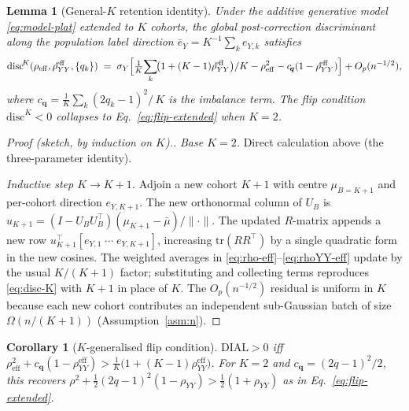 \documentclass[11pt,a4paper]{article}
\newtheorem{corollary}[theorem]{Corollary}
\newtheorem{lemma}[theorem]{Lemma}
\begin{document}
\begin{lemma}[General-$K$ retention identity]
\label{lem:retention-K}
Under the additive generative model
\eqref{eq:model-plat} extended to $K$ cohorts, the
global post-correction discriminant along the population label
direction $\bar e_Y=K^{-1}\sum_k e_{Y,k}$ satisfies
\begin{equation}
  \mathrm{disc}^{\!K}(\rho_{\mathrm{eff}},\rho_{YY}^{\!\mathrm{eff}},\{q_k\})
  \;=\; \sigma_Y\Bigl[
     \tfrac{1}{K}\!\sum_{k}\!\bigl(1+(K-1)\rho_{YY}^{\!\mathrm{eff}}\bigr)/K
     - \rho^{2}_{\mathrm{eff}}
     - c_{\!\boldsymbol q}(1-\rho_{YY}^{\!\mathrm{eff}})
  \Bigr] + O_p(n^{-1/2}),
  \label{eq:disc-K}
\end{equation}
where $c_{\!\boldsymbol q}=\tfrac{1}{K}\sum_k (2q_k-1)^2 /\,K$ is
the imbalance term.  The flip condition $\mathrm{disc}^K<0$ collapses
to Eq.~\eqref{eq:flip-extended} when $K=2$.
\end{lemma}

\begin{proof}[Proof (sketch, by induction on $K$).]
\emph{Base $K=2$.}  Direct calculation above (the three-parameter
identity).

\emph{Inductive step $K\to K+1$.}  Adjoin a new cohort $K+1$ with
centre $\mu_{B=K+1}$ and per-cohort direction $e_{Y,K+1}$.  The new
orthonormal column of $U_B$ is $u_{K+1}=(I-U_BU_B^{\!\top})(\mu_{K+1}
-\bar\mu)/\|\cdot\|$.  The updated $R$-matrix appends a new row
$u_{K+1}^{\!\top}[e_{Y,1}\;\cdots\;e_{Y,K+1}]$, increasing
$\mathrm{tr}(RR^{\!\top})$ by a single quadratic form in the new
cosines.  The weighted averages in
\eqref{eq:rho-eff}--\eqref{eq:rhoYY-eff} update by the usual
$K/(K+1)$ factor; substituting and collecting terms reproduces
\eqref{eq:disc-K} with $K\!+\!1$ in place of $K$.  The
$O_p(n^{-1/2})$ residual is uniform in $K$ because each new cohort
contributes an independent sub-Gaussian batch of size
$\Omega(n/(K+1))$ (Assumption~\ref{asm:n}).
\end{proof}

\begin{corollary}[$K$-generalised flip condition]
\label{cor:flipK}
$\mathrm{DIAL}>0$ iff
$\rho^{2}_{\!\mathrm{eff}} + c_{\!\boldsymbol q}(1-\rho_{YY}^{\!\mathrm{eff}})
> \tfrac{1}{K}\bigl(1+(K-1)\rho_{YY}^{\!\mathrm{eff}}\bigr)$.
For $K=2$ and $c_{\boldsymbol q}=(2q-1)^2/2$, this recovers
$\rho^2+\tfrac12(2q-1)^2(1-\rho_{YY}) > \tfrac12(1+\rho_{YY})$
as in Eq.~\eqref{eq:flip-extended}.
\end{corollary}
\end{document}
